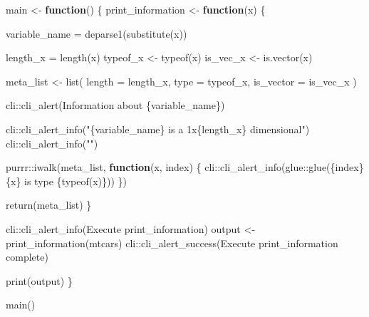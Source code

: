 \documentclass[
]{book}
\newenvironment{Shaded}{\begin{snugshade}}{\end{snugshade}}
\newcommand{\AttributeTok}[1]{\textcolor[rgb]{0.77,0.63,0.00}{#1}}
\newcommand{\ControlFlowTok}[1]{\textcolor[rgb]{0.13,0.29,0.53}{\textbf{#1}}}
\newcommand{\FunctionTok}[1]{\textcolor[rgb]{0.00,0.00,0.00}{#1}}
\newcommand{\NormalTok}[1]{#1}
\newcommand{\OtherTok}[1]{\textcolor[rgb]{0.56,0.35,0.01}{#1}}
\newcommand{\SpecialCharTok}[1]{\textcolor[rgb]{0.00,0.00,0.00}{#1}}
\newcommand{\StringTok}[1]{\textcolor[rgb]{0.31,0.60,0.02}{#1}}
\begin{document}
\begin{Shaded}
\begin{Highlighting}[]
\NormalTok{main }\OtherTok{\textless{}{-}} \ControlFlowTok{function}\NormalTok{() \{}
\NormalTok{  print\_information }\OtherTok{\textless{}{-}} \ControlFlowTok{function}\NormalTok{(x) \{}
    
\NormalTok{    variable\_name }\OtherTok{=} \FunctionTok{deparse1}\NormalTok{(}\FunctionTok{substitute}\NormalTok{(x))}
    
\NormalTok{    length\_x }\OtherTok{=} \FunctionTok{length}\NormalTok{(x)}
\NormalTok{    typeof\_x }\OtherTok{\textless{}{-}} \FunctionTok{typeof}\NormalTok{(x)}
\NormalTok{    is\_vec\_x }\OtherTok{\textless{}{-}} \FunctionTok{is.vector}\NormalTok{(x)}
    
\NormalTok{    meta\_list }\OtherTok{\textless{}{-}} \FunctionTok{list}\NormalTok{(}
      \AttributeTok{length =}\NormalTok{ length\_x, }
      \AttributeTok{type =}\NormalTok{ typeof\_x, }
      \AttributeTok{is\_vector =}\NormalTok{ is\_vec\_x}
\NormalTok{    )}
    
\NormalTok{    cli}\SpecialCharTok{::}\FunctionTok{cli\_alert}\NormalTok{(}\StringTok{\textquotesingle{}Information about \{variable\_name\}\textquotesingle{}}\NormalTok{)}
    
\NormalTok{    cli}\SpecialCharTok{::}\FunctionTok{cli\_alert\_info}\NormalTok{(}\StringTok{"\{variable\_name\} is a 1x\{length\_x\} dimensional"}\NormalTok{)}
\NormalTok{    cli}\SpecialCharTok{::}\FunctionTok{cli\_alert\_info}\NormalTok{(}\StringTok{""}\NormalTok{)}
    
\NormalTok{    purrr}\SpecialCharTok{::}\FunctionTok{iwalk}\NormalTok{(meta\_list, }\ControlFlowTok{function}\NormalTok{(x, index) \{}
\NormalTok{      cli}\SpecialCharTok{::}\FunctionTok{cli\_alert\_info}\NormalTok{(glue}\SpecialCharTok{::}\FunctionTok{glue}\NormalTok{(}\StringTok{\textquotesingle{}\{index\} \{x\} is type \{typeof(x)\}\textquotesingle{}}\NormalTok{))}
\NormalTok{    \})}
    
    \FunctionTok{return}\NormalTok{(meta\_list)}
\NormalTok{  \}}
  
\NormalTok{  cli}\SpecialCharTok{::}\FunctionTok{cli\_alert\_info}\NormalTok{(}\StringTok{\textquotesingle{}Execute print\_information\textquotesingle{}}\NormalTok{)}
\NormalTok{  output }\OtherTok{\textless{}{-}} \FunctionTok{print\_information}\NormalTok{(mtcars)}
\NormalTok{  cli}\SpecialCharTok{::}\FunctionTok{cli\_alert\_success}\NormalTok{(}\StringTok{\textquotesingle{}Execute print\_information complete\textquotesingle{}}\NormalTok{)}
  
  \FunctionTok{print}\NormalTok{(output)}
\NormalTok{\}}

\FunctionTok{main}\NormalTok{()}
\end{Highlighting}
\end{Shaded}
\end{document}
